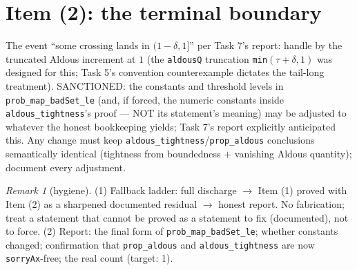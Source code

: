 \documentclass[11pt]{article}
\theoremstyle{plain}
\theoremstyle{remark}
\newtheorem{remark}{Remark}
\begin{document}
\section*{Item (2): the terminal boundary}

The event ``some crossing lands in $(1-\delta,1]$'' per Task 7's report:
handle by the truncated Aldous increment at $1$ (the \texttt{aldousQ}
truncation \texttt{min}$(\tau+\delta,1)$ was designed for this; Task 5's
convention counterexample dictates the tail-long treatment). SANCTIONED:
the constants and threshold levels in \texttt{prob\_map\_badSet\_le} (and,
if forced, the numeric constants inside \texttt{aldous\_tightness}'s proof
--- NOT its statement's meaning) may be adjusted to whatever the honest
bookkeeping yields; Task 7's report explicitly anticipated this. Any change
must keep \texttt{aldous\_tightness}/\texttt{prop\_aldous} conclusions
semantically identical (tightness from boundedness $+$ vanishing Aldous
quantity); document every adjustment.

\begin{remark}[hygiene]
(1) Fallback ladder: full discharge $\to$ Item (1) proved with Item (2) as a
sharpened documented residual $\to$ honest report. No fabrication; treat a
statement that cannot be proved as a statement to fix (documented), not to
force.
(2) Report: the final form of \texttt{prob\_map\_badSet\_le}; whether
constants changed; confirmation that \texttt{prop\_aldous} and
\texttt{aldous\_tightness} are now \texttt{sorryAx}-free; the real count
(target: 1).
\end{remark}
\end{document}
